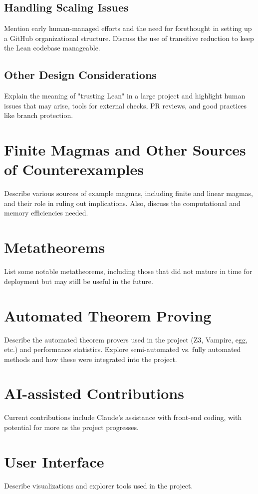 \documentclass[12pt]{article}
\theoremstyle{definition}
\begin{document}
\subsection{Handling Scaling Issues}
Mention early human-managed efforts and the need for forethought in setting up a GitHub organizational structure. Discuss the use of transitive reduction to keep the Lean codebase manageable.

\subsection{Other Design Considerations}
Explain the meaning of "trusting Lean" in a large project and highlight human issues that may arise, tools for external checks, PR reviews, and good practices like branch protection.

\section{Finite Magmas and Other Sources of Counterexamples}
Describe various sources of example magmas, including finite and linear magmas, and their role in ruling out implications. Also, discuss the computational and memory efficiencies needed.

\section{Metatheorems}
List some notable metatheorems, including those that did not mature in time for deployment but may still be useful in the future.

\section{Automated Theorem Proving}
Describe the automated theorem provers used in the project (Z3, Vampire, egg, etc.) and performance statistics. Explore semi-automated vs. fully automated methods and how these were integrated into the project.

\section{AI-assisted Contributions}
Current contributions include Claude’s assistance with front-end coding, with potential for more as the project progresses.

\section{User Interface}
Describe visualizations and explorer tools used in the project.
\end{document}
